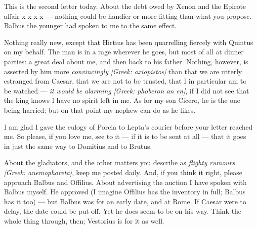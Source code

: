 

 This is the second letter today. About the debt owed by Xenon and the Epirote affair \dag x x x x \dag --- nothing could be handier or more fitting than what you propose. Balbus the younger had spoken to me to the same effect.

 Nothing really new, except that Hirtius has been quarrelling fiercely with Quintus on my behalf. The man is in a rage wherever he goes, but most of all at dinner parties: a great deal about me, and then back to his father. Nothing, however, is asserted by him more \textit{convincingly} \textit{[Greek: axiopistos]} than that we are utterly estranged from Caesar, that we are not to be trusted, that I in particular am to be watched --- \textit{it would be alarming} \textit{[Greek: phoberon an en]}, if I did not see that the king knows I have no spirit left in me. As for my son Cicero, he is the one being harried; but on that point my nephew can do as he likes.

 I am glad I gave the eulogy of Porcia to Lepta's courier before your letter reached me. So please, if you love me, see to it --- if it is to be sent at all --- that it goes in just the same way to Domitius and to Brutus.

 About the gladiators, and the other matters you describe as \textit{flighty rumours} \textit{[Greek: anemophoreta]}, keep me posted daily. And, if you think it right, please approach Balbus and Offilius. About advertising the auction I have spoken with Balbus myself. He approved (I imagine Offilius has the inventory in full; Balbus has it too) --- but Balbus was for an early date, and at Rome. If Caesar were to delay, the date could be put off. Yet he does seem to be on his way. Think the whole thing through, then; Vestorius is for it as well.
